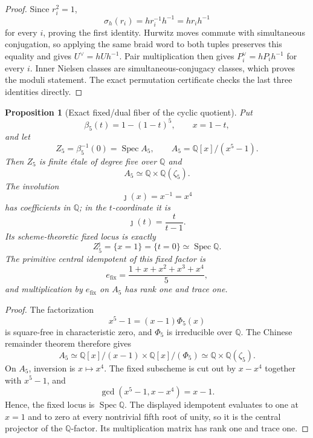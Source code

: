 \documentclass[11pt]{article}
\newtheorem{proposition}[theorem]{Proposition}
\theoremstyle{remark}
\newcommand{\Q}{\mathbb Q}
\newcommand{\Spec}{\operatorname{Spec}}
\begin{document}
\begin{proof}
Since $r_i^2=1$,
\[
 \sigma_h(r_i)=h r_i^{-1}h^{-1}=h r_i h^{-1}
\]
for every $i$, proving the first identity.  Hurwitz moves commute with
simultaneous conjugation, so applying the same braid word to both tuples
preserves this equality and gives $U^\vee=hUh^{-1}$.  Pair multiplication
then gives $P_i^\vee=h P_i h^{-1}$ for every $i$.  Inner Nielsen classes are
simultaneous-conjugacy classes, which proves the moduli statement.  The
exact permutation certificate checks the last three identities directly.
\end{proof}

\begin{proposition}[Exact fixed/dual fiber of the cyclic quotient]
\label{prop:beta5-fixed-dual}
Put
\[
 \beta_5(t)=1-(1-t)^5,
 \qquad x=1-t,
\]
and let
\[
 Z_5=\beta_5^{-1}(0)=\Spec A_5,
 \qquad
 A_5=\Q[x]/(x^5-1).
\]
Then $Z_5$ is finite \'etale of degree five over $\Q$ and
\[
 \boxed{A_5\simeq\Q\times\Q(\zeta_5).}
\]
The involution
\[
 \jmath(x)=x^{-1}=x^4
\]
has coefficients in $\Q$; in the $t$-coordinate it is
\[
 \jmath(t)=\frac{t}{t-1}.
\]
Its scheme-theoretic fixed locus is exactly
\[
 \boxed{Z_5^\jmath=\{x=1\}=\{t=0\}\simeq\Spec\Q.}
\]
The primitive central idempotent of this fixed factor is
\[
 \boxed{
 e_{\mathrm{fix}}
 =\frac{1+x+x^2+x^3+x^4}{5},
 }
\]
and multiplication by $e_{\mathrm{fix}}$ on $A_5$ has rank one and trace
one.
\end{proposition}

\begin{proof}
The factorization
\[
 x^5-1=(x-1)\Phi_5(x)
\]
is square-free in characteristic zero, and $\Phi_5$ is irreducible over
$\Q$.  The Chinese remainder theorem therefore gives
\[
 A_5\simeq\Q[x]/(x-1)\times\Q[x]/(\Phi_5)
 \simeq\Q\times\Q(\zeta_5).
\]
On $A_5$, inversion is $x\mapsto x^4$.  The fixed subscheme is cut out by
$x-x^4$ together with $x^5-1$, and
\[
 \gcd(x^5-1,x-x^4)=x-1.
\]
Hence, the fixed locus is $\Spec\Q$.  The displayed idempotent evaluates to
one at $x=1$ and to zero at every nontrivial fifth root of unity, so it is
the central projector of the $\Q$-factor.  Its multiplication matrix has
rank one and trace one.
\end{proof}
\end{document}
